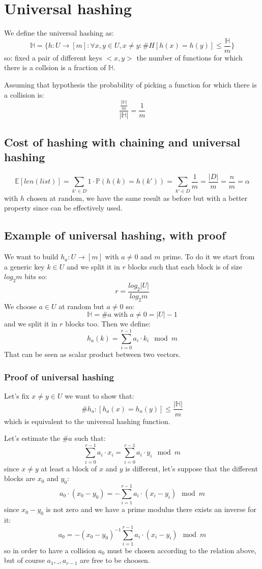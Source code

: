 \section{Universal hashing}
We define the universal hashing as:
$$
    \mathbb{H} = \{ h : U \xrightarrow{} [m] : \forall x, y \in U, x \neq y : \#H[h(x) = h(y)] \leq \frac{\mathbb{H}}{m} \}
$$
so: fixed a pair of different keys $<x, y>$ the number of functions for which there is a collsion is a fraction of $\mathbb{H}$.

Assuming that hypothesis the probability of picking a function for which there is a collision is:
$$
    \frac{\frac{|\mathbb{H}|}{m}}{|\mathbb{H}|} = \frac{1}{m}
$$

\subsection{Cost of hashing with chaining and universal hashing}
$$
    \mathbb{E}[len(list)] = \sum_{k' \in D} 1 \cdot \mathbb{P}(h(k) = h(k')) = \sum_{k' \in D} \frac{1}{m} = \frac{|D|}{m} = \frac{n}{m} = \alpha
$$
with $h$ chosen at random, we have the same result as before but with a better property since can be effectively used.

\subsection{Example of universal hashing, with proof}
We want to build $h_a : U \xrightarrow{} [m]$ with $a \neq 0$ and $m$ prime.
To do it we start from a generic key $k \in U$ and we split it in $r$ blocks such that each block is of size $log_2 m$ bits so:
$$
    r = \frac{log_2 |U|}{log_2 m}
$$
We choose $a \in U$ at random but $a \neq 0$ so:
$$
    \mathbb{H} = \# a \text{ with } a \neq 0 = |U| - 1
$$
and we split it in $r$ blocks too.
Then we define:
$$
    h_a(k) = \sum_{i = 0}^{r-1} a_i \cdot k_i \mod m
$$
That can be seen as scalar product between two vectors.

\subsubsection{Proof of universal hashing}
Let's fix $x \neq y \in U$ we want to show that:
$$
    \#h_a : [h_a(x) = h_a(y)] \leq \frac{|\mathbb{H}|}{m}
$$
which is equivalent to the universal hashing function.

Let's estimate the $\#a$ such that:
$$
    \sum_{i = 0}^{r-1} a_i \cdot x_i = \sum_{i=0}^{r-1} a_i \cdot y_i \mod m
$$
since $x \neq y$ at least a block of $x$ and $y$ is different, let's suppose that the different blocks are $x_0$ and $y_0$:
$$
    a_0 \cdot (x_0 - y_0) = - \sum_{i=1}^{r-1} a_i \cdot (x_i - y_i) \mod m
$$
since $x_0 - y_0$ is not zero and we have a prime modulus there exists an inverse for it:
$$
    a_0 = - (x_0 - y_0)^{-1} \sum_{i=1}^{r-1} a_i \cdot (x_i - y_i) \mod m
$$
so in order to have a collision $a_0$ must be chosen according to the relation above, but of course $a_1, \_, a_{r-1}$ are free to be choosen.

